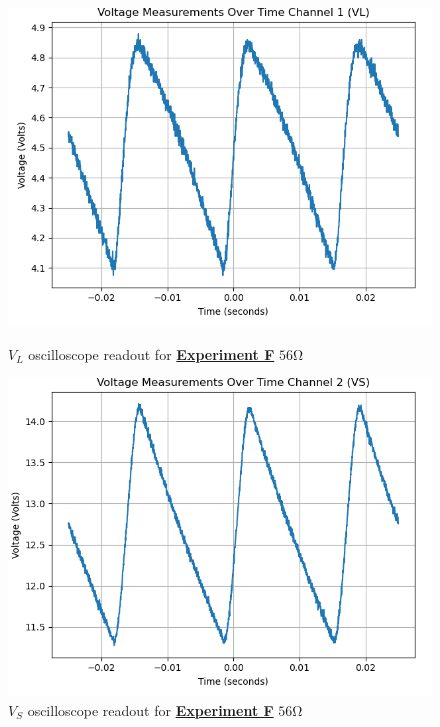 \documentclass[
	letterpaper
	12pt
]{template}
\newcommand{\bref}[2]{\textbf{\hyperref[#1]{#2}}}
\begin{document}
\begin{figure}[H]\label{data::F4}
	\centering
	\begin{minipage}[c]{0.45\textwidth}
		\centering
		\includegraphics[width=\textwidth]{figures/F/4--ch1.png}
	    \caption{$V_L$ oscilloscope readout for \bref{exp::F}{Experiment F} $56\unit{\ohm}$ }
	\end{minipage}
	\hfill
	\begin{minipage}[c]{0.45\textwidth}
		\centering
		\includegraphics[width=\textwidth]{figures/F/4--ch2.png}
	    \caption{$V_S$ oscilloscope readout for \bref{exp::F}{Experiment F} $56\unit{\ohm}$ }
	\end{minipage}
\end{figure}
\end{document}

